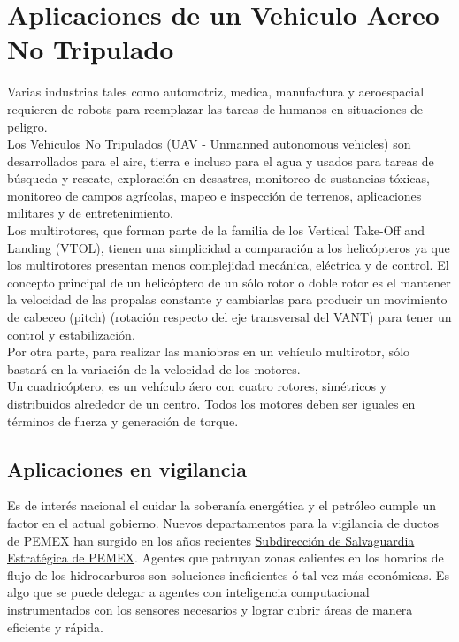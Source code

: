 \documentclass{article}
\begin{document}
\section{Aplicaciones de un Vehiculo Aereo No Tripulado}

Varias industrias tales como automotriz, medica, manufactura y aeroespacial requieren de robots para reemplazar las tareas de humanos en situaciones de peligro.\\

Los Vehiculos No Tripulados (UAV - Unmanned autonomous vehicles) son desarrollados para el aire, tierra e incluso para el agua y usados para tareas de búsqueda y rescate, exploración en desastres, monitoreo de sustancias tóxicas, monitoreo de campos agrícolas, mapeo e inspección de terrenos, aplicaciones militares y de entretenimiento.\\

Los multirotores, que forman parte de la familia de los Vertical Take-Off and Landing (VTOL), tienen una simplicidad a comparación a los helicópteros ya que los multirotores presentan menos complejidad mecánica, eléctrica y de control. El concepto principal de un helicóptero de un sólo rotor o doble rotor es el mantener la velocidad de las propalas constante y cambiarlas para producir un movimiento de cabeceo (pitch) (rotación respecto del eje transversal del VANT) para tener un control y estabilización.\\

Por otra parte, para realizar las maniobras en un vehículo multirotor, sólo bastará en la variación de la velocidad de los motores.\\

Un cuadricóptero, es un vehículo áero con cuatro rotores, simétricos y distribuidos alrededor de un centro. Todos los motores deben ser iguales en términos de fuerza y generación de torque.

\newpage
\subsection{Aplicaciones en vigilancia}

Es de interés nacional el cuidar la soberanía energética y el petróleo cumple un factor en el actual gobierno. Nuevos departamentos para la vigilancia de ductos de PEMEX han surgido en los años recientes \href{https://www.gob.mx/sedena/prensa/sedena-guardia-nacional-y-seguridad-fisica-de-pemex-aseguran-87-000-litros-de-hidrocarburo-presuntamente-robado-en-hidalgo}{Subdirección de Salvaguardia Estratégica de PEMEX}. Agentes que patruyan zonas calientes en los horarios de flujo de los hidrocarburos son soluciones ineficientes ó tal vez más económicas. Es algo que se puede delegar a agentes con inteligencia computacional instrumentados con los sensores necesarios y lograr cubrir áreas de manera eficiente y rápida.\\
\end{document}
